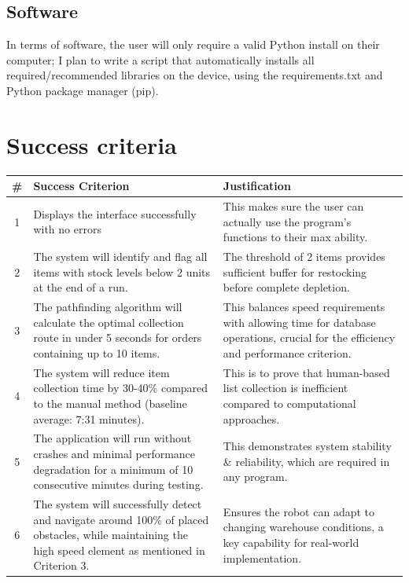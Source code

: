 \subsection{Software}

In terms of software, the user will only require a valid Python install on their computer; I plan to write a script that automatically installs all required/recommended libraries on the device, using the requirements.txt and Python package manager (pip).

\newpage
\section{Success criteria}
\begin{table}[htbp!]
\centering
\begin{tabularx}{\textwidth}{|c|X|X|}
\hline
\textbf{\#} & \textbf{Success Criterion} & \textbf{Justification} \\
\hline
1 & Displays the interface successfully with no errors & This makes sure the user can actually use the program's functions to their max ability. \\
\hline
2 & The system will identify and flag all items with stock levels below 2 units at the end of a run. & The threshold of 2 items provides sufficient buffer for restocking before complete depletion. \\
\hline
3 & The pathfinding algorithm will calculate the optimal collection route in under 5 seconds for orders containing up to 10 items. & This balances speed requirements with allowing time for database operations, crucial for the efficiency and performance criterion. \\
\hline
4 & The system will reduce item collection time by 30-40\% compared to the manual method (baseline average: 7:31 minutes). & This is to prove that human-based list collection is inefficient compared to computational approaches. \\
\hline
5 & The application will run without crashes and minimal performance degradation for a minimum of 10 consecutive minutes during testing. & This demonstrates system stability \& reliability, which are required in any program. \\
\hline
6 & The system will successfully detect and navigate around 100\% of placed obstacles, while maintaining the high speed element as mentioned in Criterion 3. & Ensures the robot can adapt to changing warehouse conditions, a key capability for real-world implementation. \\

\end{tabularx}
\end{table}
